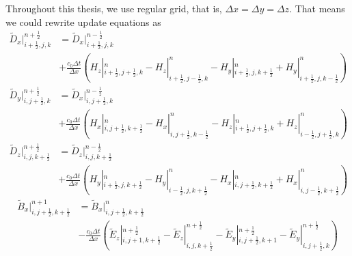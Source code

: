 Throughout this thesis, we use regular grid, that is, $\Delta x = \Delta y = \Delta z$. That means we could rewrite update equations as
\begin{equation}\label{eq:dx3d}
  \begin{split}
    \widetilde{D}_x|_{i+\frac{1}{2},j,k}^{n+\frac{1}{2}} & = \widetilde{D}_x|_{i+\frac{1}{2},j,k}^{n-\frac{1}{2}}\\
    & + \frac{c_0\Delta t}{\Delta x}\left(H_z|_{i+\frac{1}{2},j+\frac{1}{2},k}^{n} - H_z|_{i+\frac{1}{2},j-\frac{1}{2},k}^{n} - H_y|_{i+\frac{1}{2},j,k+\frac{1}{2}}^{n} + H_y|_{i+\frac{1}{2},j,k-\frac{1}{2}}^{n}\right)
  \end{split}
\end{equation}
\begin{equation}
  \begin{split}
    \widetilde{D}_y|_{i,j+\frac{1}{2},k}^{n+\frac{1}{2}} & = \widetilde{D}_x|_{i,j+\frac{1}{2},k}^{n-\frac{1}{2}}\\
    & + \frac{c_0\Delta t}{\Delta x}\left(H_x|_{i,j+\frac{1}{2},k+\frac{1}{2}}^{n} - H_x|_{i,j+\frac{1}{2},k-\frac{1}{2}}^{n} - H_z|_{i+\frac{1}{2},j+\frac{1}{2},k}^{n} + H_z|_{i-\frac{1}{2},j+\frac{1}{2},k}^{n}\right)
  \end{split}
\end{equation}
\begin{equation}\label{eq:dz3d}
  \begin{split}
    \widetilde{D}_z|_{i,j,k+\frac{1}{2}}^{n+\frac{1}{2}} & = \widetilde{D}_z|_{i,j,k+\frac{1}{2}}^{n-\frac{1}{2}}\\
    & + \frac{c_0\Delta t}{\Delta x}\left(H_y|_{i+\frac{1}{2},j,k+\frac{1}{2}}^{n} - H_y|_{i-\frac{1}{2},j,k+\frac{1}{2}}^{n} - H_x|_{i,j+\frac{1}{2},k+\frac{1}{2}}^{n} + H_x|_{i,j-\frac{1}{2},k+\frac{1}{2}}^{n}\right)
  \end{split}
\end{equation}
\begin{equation}\label{eq:bx3d}
  \begin{split}
    \widetilde{B}_x|_{i,j+\frac{1}{2},k+\frac{1}{2}}^{n+1} & = \widetilde{B}_x|_{i,j+\frac{1}{2},k+\frac{1}{2}}^{n}\\
    & - \frac{c_0\Delta t}{\Delta x}\left(\widetilde{E}_z|_{i,j+1,k+\frac{1}{2}}^{n+\frac{1}{2}} - \widetilde{E}_z|_{i,j,k+\frac{1}{2}}^{n+\frac{1}{2}} - \widetilde{E}_y|_{i,j+\frac{1}{2},k+1}^{n+\frac{1}{2}} - \widetilde{E}_y|_{i,j+\frac{1}{2},k}^{n+\frac{1}{2}}\right)
  \end{split}
\end{equation}
